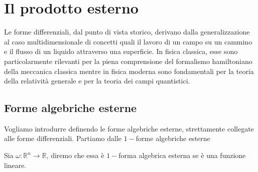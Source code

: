 \chapter{Il prodotto esterno}
Le forme differenziali, dal punto di vista storico, derivano dalla generalizzazione al caso multidimensionale di concetti
quali il lavoro di un campo su un cammino e il flusso di un liquido attraverso una superficie. In fisica classica, esse sono particolarmente
rilevanti per la piena comprensione del formalismo hamiltoniano della meccanica classica mentre in fisica moderna sono fondamentali per la
teoria della relatività generale e per la teoria dei campi quantistici.

\section{Forme algebriche esterne}
Vogliamo introdurre definendo le forme algebriche esterne, strettamente collegate alle forme differenziali. Partiamo dalle $1-$forme algebriche esterne
\begin{definition}
    Sia $\omega : \mathbb{R}^n \to \mathbb{R}$, diremo che essa è $1-$forma algebrica esterna se è una funzione lineare.
\end{definition}